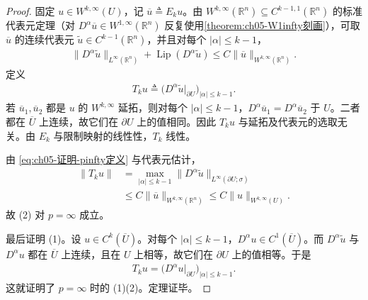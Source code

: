 \begin{proof}
固定 $u\in W^{k,\infty}(U)$，记 $\overline{u}\triangleq E_{k}u$。由 $W^{k,\infty}(\mathbb{R}^{n})\subseteq C^{k-1,1}(\mathbb{R}^{n})$ 的标准代表元定理（对 $D^{\alpha}\overline{u}\in W^{1,\infty}(\mathbb{R}^{n})$ 反复使用\cref{theorem:ch05-W1infty刻画}），可取 $\overline{u}$ 的连续代表元 $\widetilde{u}\in C^{k-1}(\mathbb{R}^{n})$，并且对每个 $|\alpha|\leqslant k-1$，
\begin{align*}
\|D^{\alpha}\widetilde{u}\|_{L^{\infty}(\mathbb{R}^{n})}
+\operatorname{Lip}(D^{\alpha}\widetilde{u})
\leqslant C\|\overline{u}\|_{W^{k,\infty}(\mathbb{R}^{n})}.
\end{align*}
定义
\begin{align}
T_{k}u\triangleq\bigl(D^{\alpha}\widetilde{u}|_{\partial U}\bigr)_{|\alpha|\leqslant k-1}.
\label{eq:ch05-证明-pinfty定义}
\end{align}
若 $\overline{u}_{1},\overline{u}_{2}$ 都是 $u$ 的 $W^{k,\infty}$ 延拓，则对每个 $|\alpha|\leqslant k-1$，$D^{\alpha}\overline{u}_{1}=D^{\alpha}\overline{u}_{2}$ 于 $U$。二者都在 $\overline{U}$ 上连续，故它们在 $\partial U$ 上的值相同。因此 $T_{k}u$ 与延拓及代表元的选取无关。由 $E_{k}$ 与限制映射的线性性，$T_{k}$ 线性。

由 \eqref{eq:ch05-证明-pinfty定义} 与代表元估计，
\begin{align*}
\|T_{k}u\|
&=
\max_{|\alpha|\leqslant k-1}
\|D^{\alpha}\widetilde{u}\|_{L^{\infty}(\partial U;\sigma)}\\
&\leqslant
C\|\overline{u}\|_{W^{k,\infty}(\mathbb{R}^{n})}
\leqslant
C\|u\|_{W^{k,\infty}(U)}.
\end{align*}
故 (2) 对 $p=\infty$ 成立。

最后证明 (1)。设 $u\in C^{k}(\overline{U})$。对每个 $|\alpha|\leqslant k-1$，$D^{\alpha}u\in C^{1}(\overline{U})$。而 $D^{\alpha}\widetilde{u}$ 与 $D^{\alpha}u$ 都在 $\overline{U}$ 上连续，且在 $U$ 上相等，故它们在 $\partial U$ 上的值相等。于是
\begin{align*}
T_{k}u=\bigl(D^{\alpha}u|_{\partial U}\bigr)_{|\alpha|\leqslant k-1}.
\end{align*}
这就证明了 $p=\infty$ 时的 (1)(2)。定理证毕。
\end{proof}

